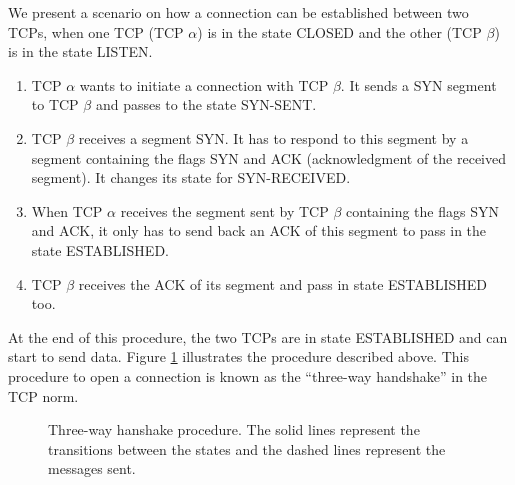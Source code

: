 \documentclass[a4paper, 10pt]{article}
\let\state\textsf
\newcommand\ESTABLISHED{\state{ESTABLISHED}}
\newcommand\SYNRECEIVED{\state{SYN-RECEIVED}}
\newcommand\CLOSED{\state{CLOSED}}
\newcommand\LISTEN{\state{LISTEN}}
\newcommand\SYNSENT{\state{SYN-SENT}}
\begin{document}
    We present a scenario on how a connection can be established between two TCPs,
    when one TCP (TCP $\alpha$) is in the state \CLOSED{} and the other (TCP $\beta$) is in the state \LISTEN.
    \begin{enumerate}
        \item TCP $\alpha$ wants to initiate a connection with TCP $\beta$. It sends a SYN segment to
            TCP $\beta$ and passes to the state \SYNSENT{}.

        \item TCP $\beta$ receives a segment SYN. It has to respond to this segment by a segment
            containing the flags SYN and ACK (acknowledgment of the received segment).
            It changes its state for \SYNRECEIVED. 

        \item When TCP $\alpha$ receives the segment sent by TCP $\beta$ containing the flags SYN and ACK,
            it only has to send back an ACK of this segment to pass in the state \ESTABLISHED.

        \item TCP $\beta$ receives the ACK of its segment and pass in state \ESTABLISHED{} too.
    \end{enumerate}
    At the end of this procedure, the two TCPs are in state \ESTABLISHED{} and can start to
    send data. Figure \ref{fig:handshake} illustrates the procedure described above.
    This procedure to open a connection is known as the ``three-way handshake'' in the TCP norm.

    \begin{figure}
        \centering
        \par
        \caption{Three-way hanshake procedure. The solid lines represent the transitions between
        the states and the dashed lines represent the messages sent.}
        \label{fig:handshake}
    \end{figure}
\end{document}
